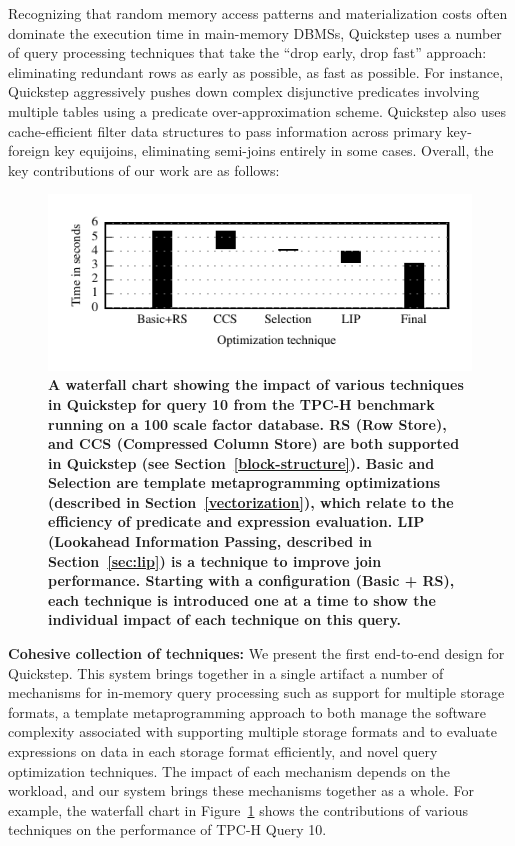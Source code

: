 Recognizing that random memory access patterns and materialization costs often dominate the execution time in main-memory DBMSs, Quickstep uses a number of query processing techniques that take the ``drop early, drop fast'' approach: eliminating redundant rows as early as possible, as fast as possible. For instance, Quickstep aggressively pushes down complex disjunctive predicates involving multiple tables using a %
predicate over-approximation scheme. Quickstep also uses cache-efficient filter data structures to pass information across primary key-foreign key equijoins,  eliminating semi-joins entirely in some cases. 
Overall, the key contributions of our work are as follows:

\begin{figure}
	\centering
	\includegraphics[width=0.45\textheight]{system/figures/tpch-q10-waterfall.pdf}
	\caption{\textbf{A waterfall chart showing the impact of various techniques in Quickstep for query 10 from the TPC-H benchmark running on a 100 scale factor database. RS (Row Store), and CCS (Compressed Column Store) are both supported in Quickstep (see Section~\ref{block-structure}). Basic and Selection are template metaprogramming optimizations (described in Section~\ref{vectorization}), which relate to the efficiency of predicate and expression evaluation. LIP (Lookahead Information Passing, described in Section~\ref{sec:lip}) is a technique to improve join performance. Starting with a configuration (Basic + RS), each technique is introduced one at a time to show the individual impact of each technique on this query.}}
	\label{fig:tpch-q10-waterfall}
\end{figure}


\textbf{Cohesive collection of techniques:} We present the first end-to-end design for Quickstep. This system brings together in a single artifact a number of mechanisms for in-memory query processing such as support for multiple storage formats, a template metaprogramming approach to both manage the software complexity associated with supporting multiple storage formats and to evaluate expressions on data in each storage format efficiently, and novel query optimization techniques.
The impact of each mechanism depends on the workload, and our system brings these mechanisms together as a whole.
For example, the waterfall chart in Figure~\ref{fig:tpch-q10-waterfall} shows the contributions of various techniques on the performance of TPC-H Query 10.

